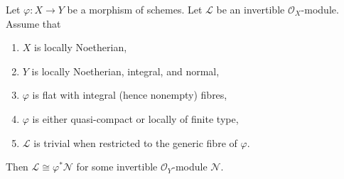 \begin{lemma}
\label{lemma-in-image-pullback}
Let $\varphi : X \to Y$ be a morphism of schemes. Let $\mathcal{L}$
be an invertible $\mathcal{O}_X$-module. Assume that
\begin{enumerate}
\item $X$ is locally Noetherian,
\item $Y$ is locally Noetherian, integral, and normal,
\item $\varphi$ is flat with integral (hence nonempty) fibres,
\item $\varphi$ is either quasi-compact or locally of finite type,
\item $\mathcal{L}$ is trivial when restricted to the generic fibre of
$\varphi$.
\end{enumerate}
Then $\mathcal{L} \cong \varphi^*\mathcal{N}$ for some invertible
$\mathcal{O}_Y$-module $\mathcal{N}$.
\end{lemma}

